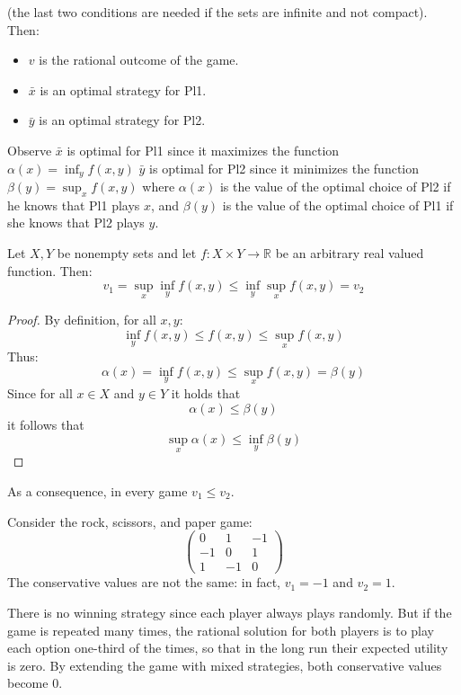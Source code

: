 (the last two conditions are needed if the sets are infinite and not compact). 
Then:
\begin{itemize}
    \item $v$ is the rational outcome of the game.
    \item $\bar{x}$ is an optimal strategy for Pl1.
    \item $\bar{y}$ is an optimal strategy for Pl2.
\end{itemize} 
Observe
$\bar{x}$ is optimal for Pl1 since it maximizes the function $\alpha(x) = \inf_y f (x, y)$
$\bar{y}$ is optimal for Pl2 since it minimizes the function $\beta(y) = \sup_xf (x, y)$
where $\alpha(x)$ is the value of the optimal choice of Pl2 if he knows that Pl1 plays $x$,
and $\beta(y)$ is the value of the optimal choice of Pl1 if she knows that Pl2 plays $y$.

\begin{proposition}
    Let $X, Y$ be nonempty sets and let $f : X \times Y \rightarrow \mathbb{R}$ be an arbitrary real valued function. 
    Then: 
    \[v_1 = \sup_x\inf_yf (x, y) \leq \inf_y\sup_xf (x, y) = v_2\]
\end{proposition}
\begin{proof}
    By definition, for all $x, y$:
    \[\inf_yf(x, y) \leq f (x, y) \leq \sup_xf (x, y)\]
    Thus:
    \[\alpha(x) = \inf_yf (x, y) \leq \sup_xf (x, y) = \beta(y)\]
    Since for all $x \in X$ and $y \in Y$ it holds that
    \[\alpha(x) \leq \beta(y)\]
    it follows that 
    \[\sup_x\alpha(x) \leq \inf_y\beta(y)\]
\end{proof}
As a consequence, in every game $v_1 \leq v_2$.

\begin{example}
    Consider the rock, scissors, and paper game: 
    \[\begin{pmatrix} 0 & 1 & -1 \\ -1 & 0 & 1 \\ 1 & -1 & 0 \end{pmatrix}\]
    The conservative values are not the same: in fact, $v_1 = -1$ and $v_2 = 1$. 
\end{example}
There is no winning strategy since each player always plays randomly. 
But if the game is repeated many times, the rational solution for both players is to play each option one-third of the times, so that in the long run their expected utility is zero.
By extending the game with mixed strategies, both conservative values become 0. 

